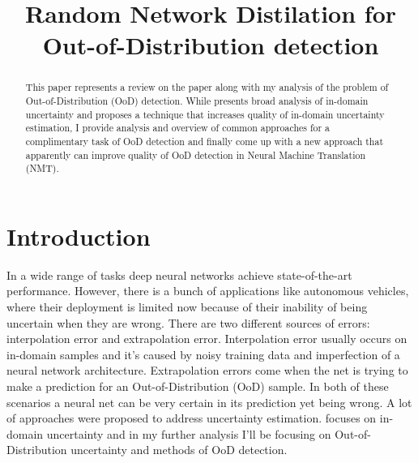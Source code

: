 \documentclass{article}
\title{Random Network Distilation for Out-of-Distribution detection}
\begin{document}


\maketitle

\begin{abstract}
    This paper represents a review on the paper \cite{pitfalls} along with my analysis of the problem of Out-of-Distribution (OoD) detection. While \cite{pitfalls} presents broad analysis of in-domain uncertainty and proposes a technique that increases quality of in-domain uncertainty estimation, I provide analysis and overview of common approaches for a complimentary task of OoD detection and finally come up with a new approach that apparently can improve quality of OoD detection in Neural Machine Translation (NMT).
\end{abstract}

\section{Introduction}
    In a wide range of tasks deep neural networks achieve state-of-the-art performance. However, there is a bunch of applications like autonomous vehicles, where their deployment is limited now because of their inability of being uncertain when they are wrong. There are two different sources of errors: interpolation error and extrapolation error. Interpolation error usually occurs on in-domain samples and it's caused by noisy training data and imperfection of a neural network architecture. Extrapolation errors come when the net is trying to make a prediction for an Out-of-Distribution (OoD) sample. In both of these scenarios a neural net can be very certain in its prediction yet being wrong. A lot of approaches were proposed to address uncertainty estimation. \cite{pitfalls} focuses on in-domain uncertainty and in my further analysis I'll be focusing on Out-of-Distribution uncertainty and methods of OoD detection.
\end{document}
